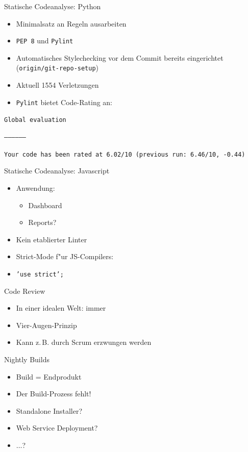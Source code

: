 \documentclass{beamer}
\newcommand{\cmark}{\ding{51}}
\begin{document}
\begin{frame}{Statische Codeanalyse: Python}
	\begin{itemize}
		\item Minimalsatz an Regeln ausarbeiten		
		\item \texttt{PEP\,8} und \texttt{Pylint}
		\item Automatisches Stylechecking vor dem Commit bereits eingerichtet (\texttt{origin/git-repo-setup})
		\item Aktuell 1554 Verletzungen
		\item \texttt{Pylint} bietet Code-Rating an:
	\end{itemize}
	\begin{center}
		\begin{minipage}{.8\textwidth}
			\texttt{Global evaluation}

			\texttt{-----------------}

			\texttt{Your code has been rated at 6.02/10 (previous run: 6.46/10, -0.44)}
		\end{minipage}
	\end{center}
\end{frame}

\begin{frame}{Statische Codeanalyse: Javascript}
	\begin{itemize}
		\item Anwendung:
			\begin{itemize}
				\item Dashboard \cmark
				\item Reports?
			\end{itemize}
		\item Kein etablierter Linter
		\item Strict-Mode f"ur JS-Compilers:
		\item[] \texttt{'use strict';}
	\end{itemize}
\end{frame}

\begin{frame}{Code Review}
	\begin{itemize}
		\item In einer idealen Welt: immer
		\item Vier-Augen-Prinzip
		\item Kann z.\,B. durch Scrum erzwungen werden
	\end{itemize}
\end{frame}

\begin{frame}{Nightly Builds}
	\begin{itemize}
		\item Build = Endprodukt
		\item Der Build-Prozess fehlt!
		\item Standalone Installer?
		\item Web Service Deployment?
		\item $\ldots$?
	\end{itemize}
\end{frame}
\end{document}
